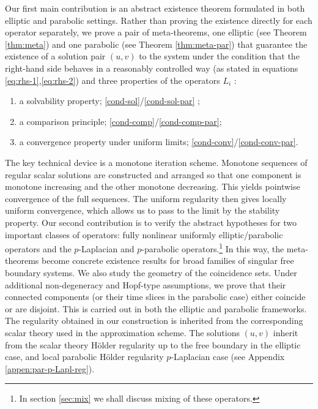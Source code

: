 \documentclass[11pt,oneside,english]{amsart}
\numberwithin{equation}{section}
\theoremstyle{plain}
\numberwithin{equation}{section}
\begin{document}
Our first main contribution is an abstract existence theorem formulated in both elliptic and parabolic settings. Rather than proving the existence directly for each operator separately, we  prove a pair of meta-theorems, one elliptic (see Theorem \ref{thm:meta}) and one parabolic (see Theorem \ref{thm:meta-par}) that guarantee the existence of a solution pair $(u, v)$ to the system under the condition that the right-hand side behaves in a reasonably controlled way (as stated in equations \eqref{eq:rhs-1},\eqref{eq:rhs-2}) and three  properties of the operators $L_i$ : 
\begin{enumerate}
\item a solvability property; \ref{cond-sol}/\ref{cond-sol-par} ;
\item a comparison principle; \ref{cond-comp}/\ref{cond-comp-par};
\item a convergence property under uniform limits; \ref{cond-conv}/\ref{cond-conv-par}.
\end{enumerate}
The key technical device is a monotone iteration scheme. Monotone sequences of regular scalar solutions are constructed and arranged so that one component is monotone increasing and the other monotone decreasing. This yields pointwise convergence of the full sequences. The uniform regularity  then gives locally uniform convergence, which allows us to pass to the limit by the stability property.
Our second contribution is to verify the abstract hypotheses for two important classes of
operators: fully nonlinear uniformly elliptic/parabolic operators and the $p$-Laplacian and $p$-parabolic operators.\footnote{In section \ref{sec:mix} we shall discuss mixing of these operators.} 
In this way, the meta-theorems become concrete existence results for broad families of singular free boundary systems.
We also study the geometry of the coincidence sets. Under additional non-degeneracy and Hopf-type assumptions, we prove that their connected components (or their time slices in the parabolic case)
either coincide or are disjoint. This is carried out in both the elliptic and parabolic frameworks.
The regularity obtained in our construction is inherited from the corresponding scalar theory used in the approximation scheme. The solutions $(u,v)$ inherit from the scalar theory %
H\"older regularity up to the free boundary in the elliptic case, and local parabolic
H\"older regularity $p$-Laplacian case
(see Appendix \ref{appen:par-p-Lapl-reg}). 
\end{document}
